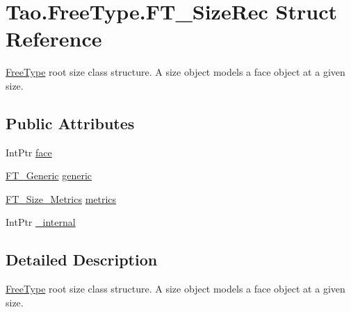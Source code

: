 \hypertarget{struct_tao_1_1_free_type_1_1_f_t___size_rec}{
\section{Tao.FreeType.FT\_\-SizeRec Struct Reference}
\label{struct_tao_1_1_free_type_1_1_f_t___size_rec}
}


\hyperlink{namespace_tao_1_1_free_type}{FreeType} root size class structure. A size object models a face object at a given size.  


\subsection*{Public Attributes}
\begin{DoxyCompactItemize}
\item 
IntPtr \hyperlink{struct_tao_1_1_free_type_1_1_f_t___size_rec_a2bd698fb859d9e4771942466f37279d2}{face}
\item 
\hyperlink{struct_tao_1_1_free_type_1_1_f_t___generic}{FT\_\-Generic} \hyperlink{struct_tao_1_1_free_type_1_1_f_t___size_rec_ab76456966c6a2035db370378576f9a45}{generic}
\item 
\hyperlink{struct_tao_1_1_free_type_1_1_f_t___size___metrics}{FT\_\-Size\_\-Metrics} \hyperlink{struct_tao_1_1_free_type_1_1_f_t___size_rec_a4b668712adf11e94823a98385262067f}{metrics}
\item 
IntPtr \hyperlink{struct_tao_1_1_free_type_1_1_f_t___size_rec_a54c3e000ab3bfb2623a3baab561d67c0}{\_\-internal}
\end{DoxyCompactItemize}


\subsection{Detailed Description}
\hyperlink{namespace_tao_1_1_free_type}{FreeType} root size class structure. A size object models a face object at a given size. 

